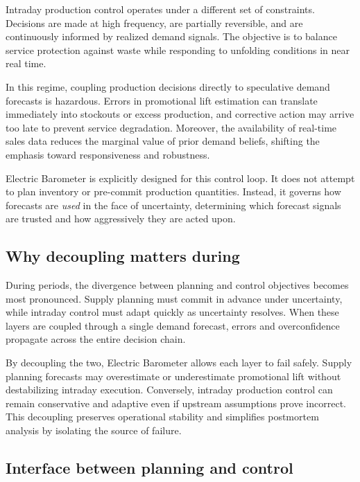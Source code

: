 Intraday production control operates under a different set of constraints. Decisions are made at
high frequency, are partially reversible, and are continuously informed by realized demand signals.
The objective is to balance service protection against waste while responding to unfolding
conditions in near real time.

In this regime, coupling production decisions directly to speculative \LTO{} demand forecasts is
hazardous. Errors in promotional lift estimation can translate immediately into stockouts or excess
production, and corrective action may arrive too late to prevent service degradation. Moreover,
the availability of real-time sales data reduces the marginal value of prior demand beliefs, shifting
the emphasis toward responsiveness and robustness.

Electric Barometer is explicitly designed for this control loop. It does not attempt to plan inventory
or pre-commit production quantities. Instead, it governs how forecasts are \emph{used} in the face
of uncertainty, determining which forecast signals are trusted and how aggressively they are acted
upon.

\subsection{Why decoupling matters during \LTOs{}}
\label{subsec:decoupling-importance}

During \LTO{} periods, the divergence between planning and control objectives becomes most
pronounced. Supply planning must commit in advance under uncertainty, while intraday control
must adapt quickly as uncertainty resolves. When these layers are coupled through a single demand
forecast, errors and overconfidence propagate across the entire decision chain.

By decoupling the two, Electric Barometer allows each layer to fail safely. Supply planning forecasts
may overestimate or underestimate promotional lift without destabilizing intraday execution.
Conversely, intraday production control can remain conservative and adaptive even if upstream
assumptions prove incorrect. This decoupling preserves operational stability and simplifies
postmortem analysis by isolating the source of failure.

\subsection{Interface between planning and control}
\label{subsec:planning-control-interface}

